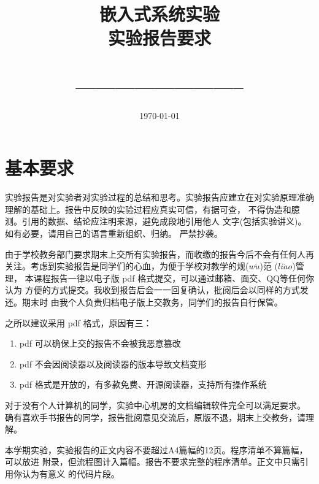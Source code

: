\documentclass[nofonts]{ctexart}
\newcommand*{\lishu}{\CJKfamily{lishu}}
\begin{document}
\title{
\lishu \LARGE 嵌入式系统实验 \\
	实验报告要求 \\\  \\
	--------------------------
}
\date{\today}
\maketitle

\large

\setlength{\parindent}{2em}

\section{基本要求}
  实验报告是对实验者对实验过程的总结和思考。实验报告应建立在对实验原理准确
理解的基础上。报告中反映的实验过程应真实可信，有据可查，
{\color{red}不得伪造和臆测}。引用的数据、结论应注明来源，避免成段地引用他人
文字(包括实验讲义)。如有必要，请用自己的语言重新组织、归纳。
{\color{red}严禁抄袭}。


   由于学校教务部门要求期末上交所有实验报告，而收缴的报告今后不会有任何人再
关注。考虑到实验报告是同学们的心血，为便于学校对教学的规($w\acute{u}$)范
($li\acute{a}o$)管理，
本课程报告一律以电子版 pdf 格式提交，可以通过邮箱、面交、QQ等任何你认为
方便的方式提交。我收到报告后会一一回复确认，批阅后会以同样的方式发还。期末时
由我个人负责归档电子版上交教务，同学们的报告自行保管。

   之所以建议采用 pdf 格式，原因有三：

\begin{enumerate}
  \item pdf 可以确保上交的报告不会被我恶意篡改
  \item pdf 不会因阅读器以及阅读器的版本导致文档变形
  \item pdf 格式是开放的，有多款免费、开源阅读器，支持所有操作系统
\end{enumerate}

   对于没有个人计算机的同学，实验中心机房的文档编辑软件完全可以满足要求。
确有喜欢手书报告的同学，报告批阅意见交流后，原版不退，期末上交教务，请理解。

本学期实验，实验报告的正文内容不要超过A4篇幅的12页。程序清单不算篇幅，可以放进
附录，但流程图计入篇幅。报告不要求完整的程序清单。正文中只需引用你认为有意义
的代码片段。
\end{document}
